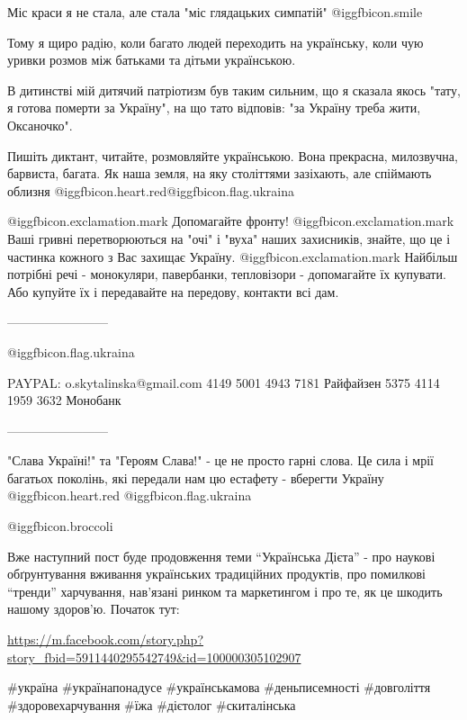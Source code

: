 
Міс краси я не стала, але стала "міс глядацьких симпатій" @igg{fbicon.smile} 

Тому я щиро радію, коли багато людей переходить на українську, коли чую уривки
розмов між батьками та дітьми українською.

В дитинстві мій дитячий патріотизм був таким сильним, що я сказала якось "тату,
я готова померти за Україну", на що тато відповів: "за Україну треба жити,
Оксаночко".


Пишіть диктант, читайте, розмовляйте українською. Вона прекрасна, милозвучна,
барвиста, багата. Як наша земля, на яку століттями зазіхають, але спіймають
облизня @igg{fbicon.heart.red}@igg{fbicon.flag.ukraina}

@igg{fbicon.exclamation.mark} ️Допомагайте фронту!
@igg{fbicon.exclamation.mark} ️Ваші гривні перетворюються на "очі" і "вуха" наших захисників, знайте, що це і частинка кожного з Вас захищає Україну.
@igg{fbicon.exclamation.mark} Найбільш потрібні речі - монокуляри, павербанки, тепловізори - допомагайте їх купувати. Або купуйте їх і передавайте на передову, контакти всі дам.

------------------------

@igg{fbicon.flag.ukraina}

\obeycr
PAYPAL: o.skytalinska@gmail.com
4149 5001 4943 7181 Райфайзен
5375 4114 1959 3632 Монобанк
\restorecr

------------------------

"Слава Україні!" та "Героям Слава!" - це не просто гарні слова. Це сила і мрії
багатьох поколінь, які передали нам цю естафету - вберегти Україну
@igg{fbicon.heart.red} @igg{fbicon.flag.ukraina}

@igg{fbicon.broccoli} 

Вже наступний пост буде продовження теми \enquote{Українська Дієта} - про наукові
обґрунтування вживання українських традиційних продуктів, про помилкові
\enquote{тренди} харчування, нав'язані ринком та маркетингом і про те, як це шкодить
нашому здоров'ю. Початок тут:

\url{https://m.facebook.com/story.php?story_fbid=5911440295542749&id=100000305102907}

\#україна \#українапонадусе \#українськамова \#деньписемності  \#довголіття \#здоровехарчування \#їжа \#дієтолог \#скиталінська

